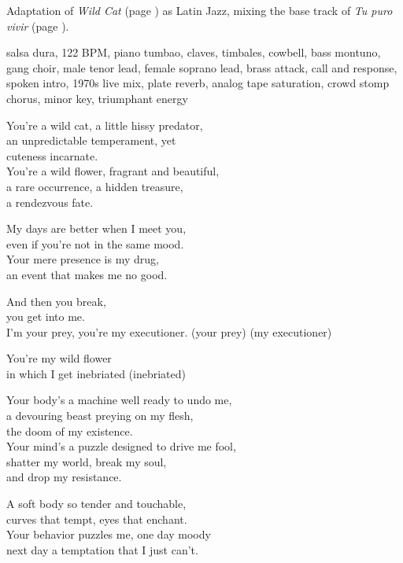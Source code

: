 
\begin{notes}
Adaptation of \emph{Wild Cat} (page \pageref{sec:wild-cat}) as Latin Jazz, mixing the base track of \emph{Tu puro vivir} (page \pageref{sec:tu-puro-vivir}).
\end{notes}
\begin{style}
salsa dura, 122 BPM, piano tumbao, claves, timbales, cowbell, bass montuno, gang choir, male tenor lead, female soprano lead, brass attack, call and response, spoken intro, 1970s live mix, plate reverb, analog tape saturation, crowd stomp chorus, minor key, triumphant energy
\end{style}
\begin{lyrics}
You’re a wild cat, a little hissy predator,\\
an unpredictable temperament, yet\\
cuteness incarnate.\\
You’re a wild flower, fragrant and beautiful,\\
a rare occurrence, a hidden treasure,\\
a rendezvous fate.

My days are better when I meet you,\\
even if you’re not in the same mood.\\
Your mere presence is my drug,\\
an event that makes me no good.

And then you break,\\
you get into me.\\
I’m your prey, you’re my executioner.
(your prey)
(my executioner)

You’re my wild flower\\
in which I get inebriated
(inebriated)

Your body’s a machine well ready to undo me,\\
a devouring beast preying on my flesh,\\
the doom of my existence.\\
Your mind’s a puzzle designed to drive me fool,\\
shatter my world, break my soul,\\
and drop my resistance.

A soft body so tender and touchable,\\
curves that tempt, eyes that enchant.\\
Your behavior puzzles me, one day moody\\
next day a temptation that I just can’t.


\end{lyrics}
